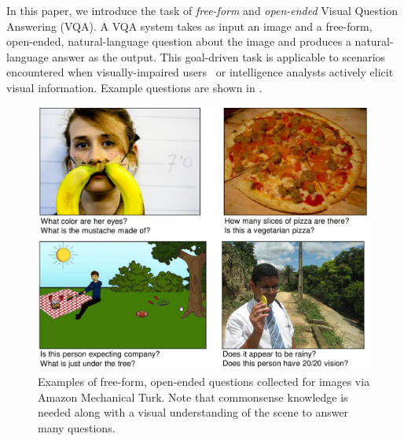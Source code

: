 In this paper, we introduce the task of \emph{free-form} and \emph{open-ended}
Visual Question Answering (VQA).
A VQA system takes as input an image and a free-form, open-ended, natural-language question
about the image and produces a natural-language answer as the output.
This goal-driven task is applicable to scenarios encountered when visually-impaired
users~\cite{vizwiz} or intelligence analysts actively elicit visual information.
Example questions are shown in .

\begin{figure}[t]
\includegraphics[width=1\linewidth]{figures/teaser_v2.pdf}
\caption{Examples of free-form, open-ended questions collected for images via Amazon Mechanical Turk.
Note that commonsense knowledge is needed along with a visual understanding of the scene
to answer many questions.}
\label{fig:teaser}
\end{figure}


